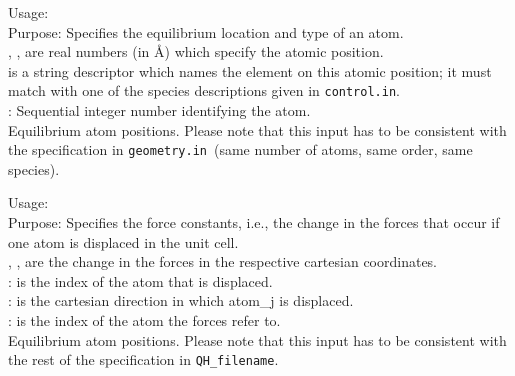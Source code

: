 {
  \noindent
  Usage:     
   \\[1.0ex]
  Purpose: Specifies the equilibrium location and type of an atom. \\[1.0ex]
  , ,  are real numbers (in \AA) which
  specify the atomic position. \\[1.0ex]
   is a string descriptor which names the element on
    this atomic position; it must match with one of the species descriptions
    given in \texttt{control.in}. \\[1.0ex]
   :  Sequential integer number identifying the atom.\\
}
Equilibrium atom positions. Please note that this input has to be consistent 
with the specification in \texttt{geometry.in}~(same number of atoms, same order, same species).

{
  \noindent
  Usage:     
    \\[1.0ex]
  Purpose: Specifies the force constants, i.e., the change in the forces that 
  occur if one atom is displaced in the unit cell. \\[1.0ex]
  , ,  are the change in the forces 
   in the respective cartesian coordinates. \\[1.0ex]
     : is the index of the atom that is displaced. \\[1.0ex]
   : is the cartesian direction in which atom\_j is displaced. \\[1.0ex]
     : is the index of the atom the forces refer to.\\
}
Equilibrium atom positions. Please note that this input has to be consistent 
with the rest of the specification in \texttt{QH\_filename}.\\

